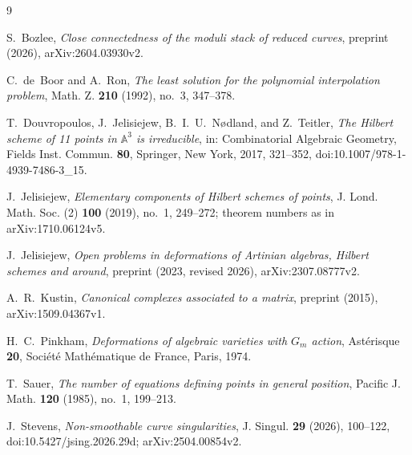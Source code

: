 \documentclass{amsart}
\theoremstyle{definition}
\theoremstyle{remark}
\numberwithin{equation}{section}
\begin{document}
\begin{thebibliography}{9}

S.~Bozlee, \emph{Close connectedness of the moduli stack of reduced curves}, preprint
(2026), arXiv:2604.03930v2.

C.~de~Boor and A.~Ron, \emph{The least solution for the polynomial interpolation problem},
Math. Z. \textbf{210} (1992), no.~3, 347--378.

T.~Douvropoulos, J.~Jelisiejew, B.~I.~U.~N\o dland, and Z.~Teitler, \emph{The Hilbert
scheme of 11 points in $\mathbb A^3$ is irreducible}, in: Combinatorial Algebraic Geometry,
Fields Inst. Commun. \textbf{80}, Springer, New York, 2017, 321--352,
doi:10.1007/978-1-4939-7486-3\_15.

J.~Jelisiejew, \emph{Elementary components of Hilbert schemes of points}, J. Lond. Math.
Soc. (2) \textbf{100} (2019), no.~1, 249--272; theorem numbers as in arXiv:1710.06124v5.

J.~Jelisiejew, \emph{Open problems in deformations of Artinian algebras, Hilbert schemes
and around}, preprint (2023, revised 2026), arXiv:2307.08777v2.

A.~R.~Kustin, \emph{Canonical complexes associated to a matrix}, preprint (2015),
arXiv:1509.04367v1.

H.~C.~Pinkham, \emph{Deformations of algebraic varieties with $G_m$ action}, Ast\'erisque
\textbf{20}, Soci\'et\'e Math\'ematique de France, Paris, 1974.

T.~Sauer, \emph{The number of equations defining points in general position}, Pacific J.
Math. \textbf{120} (1985), no.~1, 199--213.

J.~Stevens, \emph{Non-smoothable curve singularities}, J. Singul. \textbf{29} (2026),
100--122, doi:10.5427/jsing.2026.29d; arXiv:2504.00854v2.

\end{thebibliography}
\end{document}
